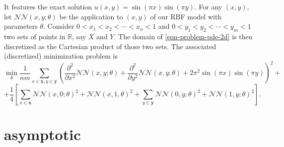 \documentclass[12pt]{report} %
\newcommand{\tmmathbf}[1]{\ensuremath{\boldsymbol{#1}}}
\begin{document}
It features the exact solution $u (x, y) = \sin (\pi x) \sin (\pi y)$. For any
$(x, y)$, let $\mathcal{N}\mathcal{N} (x, y ; \theta)$ be the application to
$(x, y)$ of our RBF model with parameters $\theta$. Consider $0 < x_1 < x_2 <
  \cdots < x_n < 1$ and $0 < y_1 < y_2 < \cdots < y_m < 1$ two sets of points in
$\mathbb{R}$, say $X$ and $Y$. The domain of \eqref{eqn-problem-pde-2d} is
then discretized as the Cartesian product of those two sets. The associated (discretized) minimization problem is
\[ \min_{\theta} \frac{1}{n m} \sum_{x \in \tmmathbf{x}, y \in \tmmathbf{y}}
  \left( \frac{\partial^2}{\partial x^2} \mathcal{N}\mathcal{N} (x, y ;
    \theta) + \frac{\partial^2}{\partial y^2} \mathcal{N}\mathcal{N} (x, y ;
    \theta) + 2 \pi^2 \sin (\pi x) \sin (\pi y) \right)^2 + \]
\[ + \frac{1}{4} \left[ \sum_{x \in \tmmathbf{x}} \mathcal{N}\mathcal{N} (x, 0
    ; \theta)^2 +\mathcal{N}\mathcal{N} (x, 1, \theta)^2 + \sum_{y \in
      \tmmathbf{y}} \mathcal{N}\mathcal{N} (0, y ; \theta)^2
    +\mathcal{N}\mathcal{N} (1, y ; \theta)^2 \right] . \]









\clearpage


\printbibliography







\clearpage

\section*{asymptotic}
\end{document}
